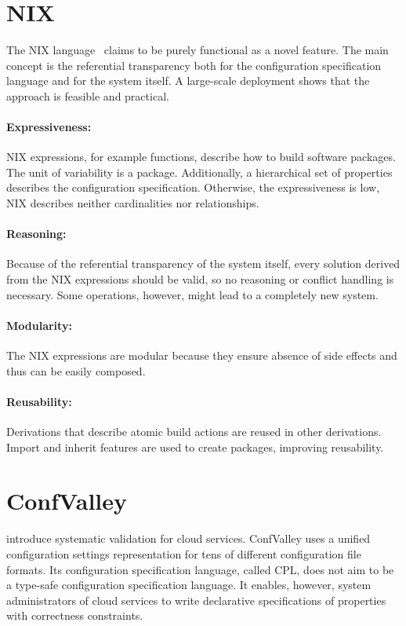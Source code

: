 \section{NIX}

The NIX language~\cite{dolstra2007purely} claims to be purely functional as a novel feature.
The main concept is the referential transparency both for the configuration specification language and for the system itself.
A large-scale deployment shows that the approach is feasible and practical.

\paragraph*{Expressiveness:}
NIX expressions, for example functions, describe how to build software packages.
The unit of variability is a package.
Additionally, a hierarchical set of properties describes the configuration specification.
Otherwise, the expressiveness is low, NIX describes neither cardinalities nor relationships.

\paragraph*{Reasoning:}
Because of the referential transparency of the system itself, every solution derived from the NIX expressions should be valid, so no reasoning or conflict handling is necessary.
Some operations, however, might lead to a completely new system.

\paragraph*{Modularity:}
The NIX expressions are modular because they ensure absence of side effects and thus can be easily composed.

\paragraph*{Reusability:}
Derivations that describe atomic build actions are reused in other derivations.
Import and inherit features are used to create packages, improving reusability.




\section{ConfValley}

\citet{huang2015confvalley} introduce systematic validation for cloud services.
ConfValley uses a unified configuration settings representation for tens of different configuration file formats.
Its configuration specification language, called CPL, does not aim to be a type-safe configuration specification language.
It enables, however, system administrators of cloud services to write declarative specifications of properties with correctness constraints.

